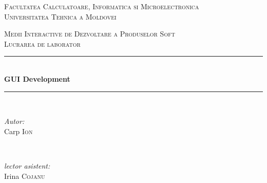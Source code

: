 \begin{titlepage}


  \begin{center} 

  \textsc{\large Facultatea Calculatoare, Informatica si Microelectronica}\\[0.5cm]
  \textsc{\large Universitatea Tehnica a Moldovei}\\[1.2cm] 
  \vspace{25 mm}

  \textsc{\Large Medii Interactive de Dezvoltare a Produselor Soft}\\[0.5cm] 
  \textsc{\large Lucrarea de laborator\3}\\[0.5cm]
  
\newcommand{\HRule}{\rule{\linewidth}{0.5mm}} 

  \vspace{10 mm}
  \HRule \\[0.4cm]
  { \LARGE \bfseries GUI Development  }\\[0.4cm] 
  \HRule \\[1.5cm]

      \vspace{30mm}

      \begin{minipage}{0.4\textwidth}
      \begin{flushleft} \large
      \emph{Autor:}\\
      Carp \textsc{Ion}
      \end{flushleft}
      \end{minipage}
      ~
      \begin{minipage}{0.4\textwidth}
      \begin{flushright} \large
      \emph{lector asistent:} \\
      Irina \textsc{Cojanu} \\  
      
      \end{flushright}
      \end{minipage}\\[4cm]

      \vspace{5 mm}
     
      \vfill
      \end{center}
      
\end{titlepage}